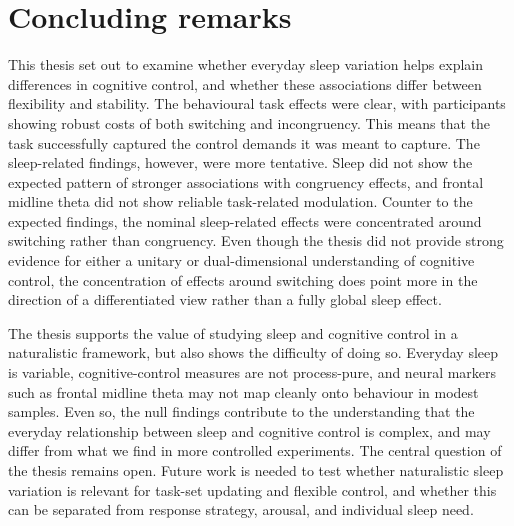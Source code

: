 \documentclass[12pt,a4paper]{report}
\begin{document}
\section{Concluding remarks}

This thesis set out to examine whether everyday sleep variation helps explain differences in cognitive control, and whether these associations differ between flexibility and stability. The behavioural task effects were clear, with participants showing robust costs of both switching and incongruency. This means that the task successfully captured the control demands it was meant to capture. The sleep-related findings, however, were more tentative. Sleep did not show the expected pattern of stronger associations with congruency effects, and frontal midline theta did not show reliable task-related modulation. Counter to the expected findings, the nominal sleep-related effects were concentrated around switching rather than congruency. Even though the thesis did not provide strong evidence for either a unitary or dual-dimensional understanding of cognitive control, the concentration of effects around switching does point more in the direction of a differentiated view rather than a fully global sleep effect.

The thesis supports the value of studying sleep and cognitive control in a naturalistic framework, but also shows the difficulty of doing so. Everyday sleep is variable, cognitive-control measures are not process-pure, and neural markers such as frontal midline theta may not map cleanly onto behaviour in modest samples. Even so, the null findings contribute to the understanding that the everyday relationship between sleep and cognitive control is complex, and may differ from what we find in more controlled experiments. The central question of the thesis remains open. Future work is needed to test whether naturalistic sleep variation is relevant for task-set updating and flexible control, and whether this can be separated from response strategy, arousal, and individual sleep need.



\printbibliography[heading=bibintoc,title={References}]
\end{document}
